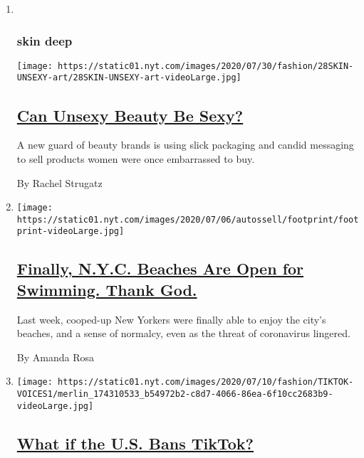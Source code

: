 \begin{enumerate}
\def\labelenumi{\arabic{enumi}.}
\item ~
  \hypertarget{skin-deep}{%
  \subsubsection{skin deep}\label{skin-deep}}

  \texttt{[image: https://static01.nyt.com/images/2020/07/30/fashion/28SKIN-UNSEXY-art/28SKIN-UNSEXY-art-videoLarge.jpg]}

  \hypertarget{can-unsexy-beauty-be-sexy}{%
  \subsection{\texorpdfstring{\href{/2020/07/28/style/can-unsexy-beauty-be-sexy.html}{Can
  Unsexy Beauty Be
  Sexy?}}{Can Unsexy Beauty Be Sexy?}}\label{can-unsexy-beauty-be-sexy}}

  A new guard of beauty brands is using slick packaging and candid
  messaging to sell products women were once embarrassed to buy.

  By Rachel Strugatz
\item
  \texttt{[image: https://static01.nyt.com/images/2020/07/06/autossell/footprint/footprint-videoLarge.jpg]}

  \hypertarget{finally-nyc-beaches-are-open-for-swimming-thank-god}{%
  \subsection{\texorpdfstring{\href{/interactive/2020/07/07/nyregion/nyc-beaches-open.html}{Finally,
  N.Y.C. Beaches Are Open for Swimming. Thank
  God.}}{Finally, N.Y.C. Beaches Are Open for Swimming. Thank God.}}\label{finally-nyc-beaches-are-open-for-swimming-thank-god}}

  Last week, cooped-up New Yorkers were finally able to enjoy the city's
  beaches, and a sense of normalcy, even as the threat of coronavirus
  lingered.

  By Amanda Rosa
\item
  \texttt{[image: https://static01.nyt.com/images/2020/07/10/fashion/TIKTOK-VOICES1/merlin\_174310533\_b54972b2-c8d7-4066-86ea-6f10cc2683b9-videoLarge.jpg]}

  \hypertarget{what-if-the-us-bans-tiktok}{%
  \subsection{\texorpdfstring{\href{/2020/07/10/style/tiktok-ban-us-users-influencers-taylor-lorenz.html}{What
  if the U.S. Bans
  TikTok?}}{What if the U.S. Bans TikTok?}}\label{what-if-the-us-bans-tiktok}}


\end{enumerate}
